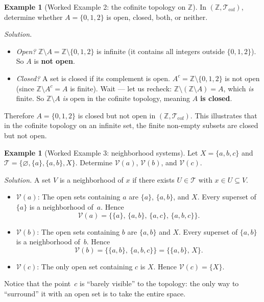 \documentclass[11pt,a4paper,twoside]{book}
\theoremstyle{remark}
\theoremstyle{definition}
\newtheorem{exampleplain}[theorem]{Example}
\theoremstyle{definition}
\newcommand{\Tau}{\mathcal{T}}           %
\newcommand{\Nbhd}{\mathcal{V}}          %
\newcommand{\Z}{\mathbb{Z}}
\begin{document}
\begin{exampleplain}[Worked Example 2: the cofinite topology on $\Z$]
\label{ex:worked2}
In $(\Z,\Tau_{\mathrm{cof}})$, determine whether $A=\{0,1,2\}$ is open,
closed, both, or neither.

\emph{Solution.}
\begin{itemize}
  \item \emph{Open?}  $\Z\setminus A = \Z\setminus\{0,1,2\}$ is infinite
        (it contains all integers outside $\{0,1,2\}$).  So $A$ is
        \textbf{not open}.
  \item \emph{Closed?}  A set is closed if its complement is open.
        $A^c=\Z\setminus\{0,1,2\}$ is not open (since $\Z\setminus A^c=A$ is
        finite).  Wait --- let us recheck: $\Z\setminus(\Z\setminus A)=A$,
        which \emph{is} finite.  So $\Z\setminus A$ \emph{is} open in the
        cofinite topology, meaning $A$ \textbf{is closed}.
\end{itemize}
Therefore $A=\{0,1,2\}$ is closed but not open in $(\Z,\Tau_{\mathrm{cof}})$.
This illustrates that in the cofinite topology on an infinite set, the finite
non-empty subsets are closed but not open.
\end{exampleplain}

\begin{exampleplain}[Worked Example 3: neighborhood systems]
\label{ex:worked3}
Let $X=\{a,b,c\}$ and $\Tau=\{\varnothing,\{a\},\{a,b\},X\}$.  Determine
$\Nbhd(a)$, $\Nbhd(b)$, and $\Nbhd(c)$.

\emph{Solution.}
A set $V$ is a neighborhood of $x$ if there exists $U\in\Tau$ with
$x\in U\subseteq V$.

\begin{itemize}
  \item $\Nbhd(a)$: The open sets containing $a$ are $\{a\}$, $\{a,b\}$,
        and $X$.  Every superset of $\{a\}$ is a neighborhood of~$a$.  Hence
        \[
          \Nbhd(a) = \{\{a\},\,\{a,b\},\,\{a,c\},\,\{a,b,c\}\}.
        \]
  \item $\Nbhd(b)$: The open sets containing $b$ are $\{a,b\}$ and $X$.
        Every superset of $\{a,b\}$ is a neighborhood of~$b$.  Hence
        \[
          \Nbhd(b) = \{\{a,b\},\,\{a,b,c\}\} = \{\{a,b\},\, X\}.
        \]
  \item $\Nbhd(c)$: The only open set containing $c$ is $X$.  Hence
        $\Nbhd(c)=\{X\}$.
\end{itemize}
Notice that the point~$c$ is ``barely visible'' to the topology: the only way
to ``surround'' it with an open set is to take the entire space.
\end{exampleplain}
\end{document}
